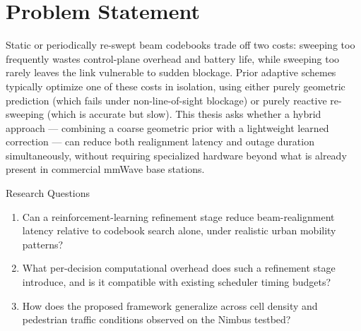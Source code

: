 \section{Problem Statement}
Static or periodically re-swept beam codebooks trade off two costs: sweeping
too frequently wastes control-plane overhead and battery life, while sweeping
too rarely leaves the link vulnerable to sudden blockage. Prior adaptive
schemes typically optimize one of these costs in isolation, using either
purely geometric prediction (which fails under non-line-of-sight blockage) or
purely reactive re-sweeping (which is accurate but slow). This thesis asks
whether a hybrid approach --- combining a coarse geometric prior with a
lightweight learned correction --- can reduce both realignment latency and
outage duration simultaneously, without requiring specialized hardware beyond
what is already present in commercial mmWave base stations.

\begin{kubox}{Research Questions}
\begin{enumerate}[label=\textbf{RQ\arabic*.}, leftmargin=2.1cm]
  \item Can a reinforcement-learning refinement stage reduce beam-realignment
        latency relative to codebook search alone, under realistic urban
        mobility patterns?
  \item What per-decision computational overhead does such a refinement stage
        introduce, and is it compatible with existing scheduler timing
        budgets?
  \item How does the proposed framework generalize across cell density and
        pedestrian traffic conditions observed on the Nimbus testbed?
\end{enumerate}
\end{kubox}
